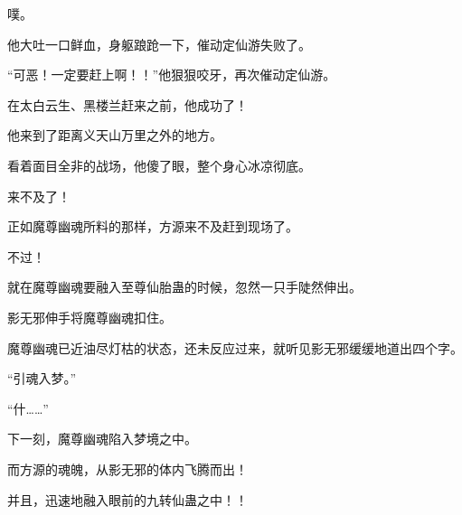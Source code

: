 \begin{this_body}
噗。

他大吐一口鲜血，身躯踉跄一下，催动定仙游失败了。

“可恶！一定要赶上啊！！”他狠狠咬牙，再次催动定仙游。

在太白云生、黑楼兰赶来之前，他成功了！

他来到了距离义天山万里之外的地方。

看着面目全非的战场，他傻了眼，整个身心冰凉彻底。

来不及了！

正如魔尊幽魂所料的那样，方源来不及赶到现场了。

不过！

就在魔尊幽魂要融入至尊仙胎蛊的时候，忽然一只手陡然伸出。

影无邪伸手将魔尊幽魂扣住。

魔尊幽魂已近油尽灯枯的状态，还未反应过来，就听见影无邪缓缓地道出四个字。

“引魂入梦。”

“什……”

下一刻，魔尊幽魂陷入梦境之中。

而方源的魂魄，从影无邪的体内飞腾而出！

并且，迅速地融入眼前的九转仙蛊之中！！

\end{this_body}

